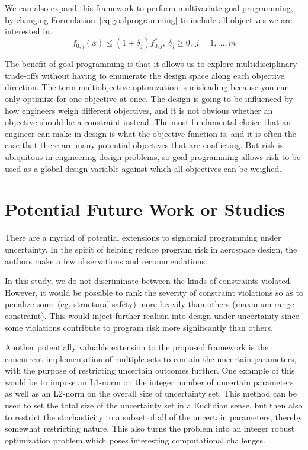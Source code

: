 We can also expand this framework to perform multivariate goal programming,
by changing Formulation~\ref{eq:goalprogramming} to include all
objectives we are interested in.
\begin{equation}
    f_{0,j}(x) \leq (1+\delta_j) f^*_{0,j},~\delta_j \geq 0,~j = 1,\ldots, m
    \label{eq:multigoal}
\end{equation}

The benefit of goal programming is that it allows us to explore multidisciplinary trade-offs without
having to enumerate the design space along each objective direction.
The term multiobjective optimization is misleading
because you can only optimize for one objective at once.
The design is going to be influenced by how engineers weigh different objectives, and
it is not obvious whether an objective should be a constraint instead. The most
fundamental choice that an engineer can make in design is what the objective function is, and it is
often the case that there are many potential objectives that are conflicting.
But risk is ubiquitous in engineering design problems, so goal programming allows risk to be used as
a global design variable against which all objectives can be weighed.

\section{Potential Future Work or Studies}

There are a myriad of potential extensions to signomial programming under uncertainty.
In the spirit of helping reduce program risk in aerospace design,
the authors make a few observations and recommendations.

In this study, we do not discriminate between the kinds of constraints violated. However, it would
be possible to rank the severity of constraint violations so as to penalize some (eg. structural safety)
more heavily than others (maximum range constraint). This would inject further realism into
design under uncertainty since some violations contribute to program risk more
significantly than others.

Another potentially valuable extension to the proposed framework is the concurrent implementation
of multiple sets to contain the uncertain parameters, with the purpose of restricting uncertain
outcomes further. One example of this would be to impose an  L1-norm on the integer number of uncertain parameters
as well as an L2-norm on the overall size of uncertainty set.
This method can be used to set the total size of the uncertainty set in a Euclidian sense,
but then also to restrict the stochasticity to a subset of all of the uncertain parameters,
thereby somewhat restricting nature. This also turns the problem into an integer robust
optimization problem which poses interesting computational challenges.

